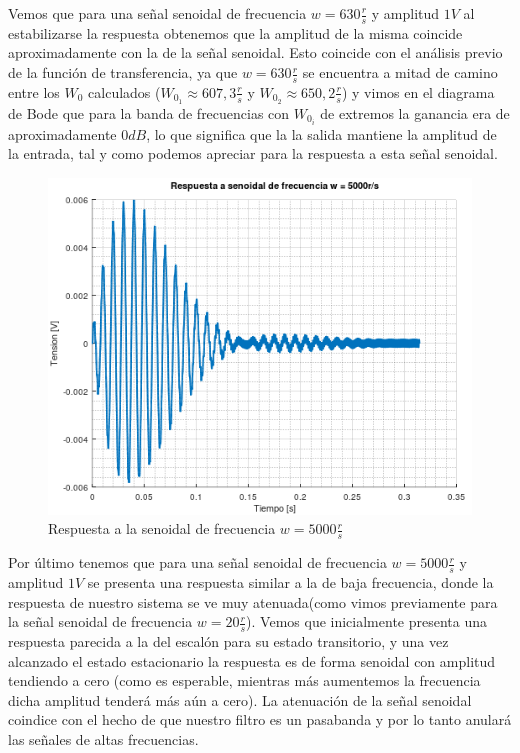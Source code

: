 \documentclass[11pt,a4paper]{report}
\begin{document}
Vemos que para una señal senoidal de frecuencia $w = 630\frac{r}{s}$ y amplitud
$1V$ al estabilizarse la respuesta obtenemos que la amplitud de la misma coincide aproximadamente con la de la señal senoidal. Esto coincide con el análisis
previo de la función de transferencia, ya que $w = 630\frac{r}{s}$ se encuentra a mitad de camino entre los $W_{0}$ calculados ($W_{0_{1}} \approx 607,3 \frac{r}{s}$ y 
$W_{0_{2}} \approx 650,2 \frac{r}{s}$) y vimos en el diagrama de Bode que para la banda de frecuencias con $W_{0_{i}}$ de extremos la ganancia era de aproximadamente $0dB$, lo que significa que la la salida mantiene la amplitud de la entrada, tal y como podemos apreciar para la respuesta a esta señal senoidal.

\newpage
\begin{figure}[h!]
\includegraphics[scale=0.98]{RtaSenoidalAlto.png}
\caption{Respuesta a la senoidal de frecuencia $w = 5000\frac{r}{s}$}
\end{figure}

Por último tenemos que para una señal senoidal de frecuencia $w = 5000\frac{r}{s}$ y amplitud $1V$ se presenta una respuesta similar a la de baja frecuencia, donde la respuesta de nuestro sistema se ve muy atenuada(como vimos previamente para la señal senoidal de frecuencia $w = 20\frac{r}{s}$). Vemos que inicialmente presenta una respuesta parecida a la del escalón para su estado transitorio, y una vez alcanzado el estado
estacionario la respuesta es de forma senoidal con amplitud tendiendo a cero (como es esperable, mientras más aumentemos la frecuencia dicha amplitud tenderá más aún a cero). La atenuación de la señal senoidal coindice con el hecho de que nuestro filtro es un pasabanda y por lo tanto anulará las señales de altas frecuencias.
\end{document}
